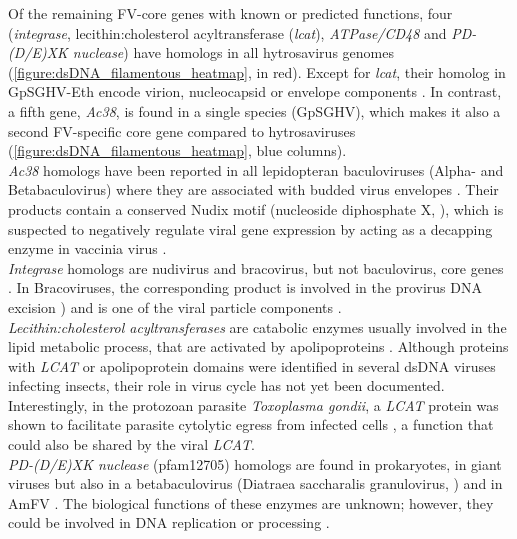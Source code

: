 Of the remaining FV-core genes with known or predicted functions, four (\textit{integrase}, lecithin:cholesterol acyltransferase (\textit{lcat}), \textit{ATPase/CD48} and \textit{PD-(D/E)XK nuclease}) have homologs in all hytrosavirus genomes (\figurename{\ref{figure:dsDNA_filamentous_heatmap}}, in red).  Except for \textit{lcat}, their homolog in GpSGHV-Eth encode virion, nucleocapsid or envelope components \citep{abd-alla_comprehensive_2016}. In contrast, a fifth gene, \textit{Ac38}, is found in a single species (GpSGHV), which makes it also a second FV-specific core gene compared to hytrosaviruses (\figurename{\ref{figure:dsDNA_filamentous_heatmap}}, blue columns). \\

\textit{Ac38} homologs have been reported in all lepidopteran baculoviruses (Alpha- and Betabaculovirus) where they are associated with budded virus envelopes \citep{wang_characterization_2005}. Their products contain a conserved Nudix motif (nucleoside diphosphate X, \citep{mildvan_structures_2005}), which is suspected to negatively regulate viral gene expression by acting as a decapping enzyme in vaccinia virus \citep{parrish_characterization_2007}.\\ 

\textit{Integrase} homologs are nudivirus and bracovirus, but not baculovirus, core genes \citep{petersen_naked_2022}. In Bracoviruses, the corresponding product is involved in the provirus DNA excision \citep{burke_mutualistic_2013}) and is one of the viral particle components \citep{burke_widespread_2014}. \\

\textit{Lecithin:cholesterol acyltransferases} are catabolic enzymes usually involved in the lipid metabolic process, that are activated by apolipoproteins \citep{saeedi_review_2015}. Although proteins with \textit{LCAT} \citep{garcia-maruniak_sequence_2008, lepetit_genome_2017, wallace_discovery_2021} or apolipoprotein domains \citep{gauthier_apis_2015, lepetit_genome_2017} were identified in several dsDNA viruses infecting insects, their role in virus cycle has not yet been documented. Interestingly, in the protozoan parasite \textit{Toxoplasma gondii}, a \textit{LCAT} protein was shown to facilitate parasite cytolytic egress from infected cells \citep{pszenny_lipolytic_2016}, a function that could also be shared by the viral \textit{LCAT}. \\

\textit{PD-(D/E)XK nuclease} (pfam12705) homologs are found in prokaryotes, in giant viruses but also in a betabaculovirus (Diatraea saccharalis granulovirus, \citep{ardisson-araujo_betabaculovirus_2016}) and in AmFV \citep{gauthier_apis_2015}. The biological functions of these enzymes are unknown; however, they could be involved in DNA replication or processing \citep{steczkiewicz_sequence_2012}.\\ 

